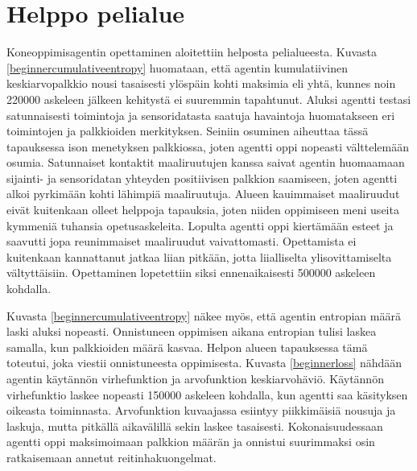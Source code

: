 \documentclass[utf8]{gradu3}
\begin{document}
\section{Helppo pelialue}
\label{helppo}

Koneoppimisagentin opettaminen aloitettiin helposta pelialueesta. Kuvasta \ref{beginnercumulativeentropy} huomataan, että agentin kumulatiivinen keskiarvopalkkio nousi tasaisesti ylöspäin kohti maksimia eli yhtä, kunnes noin 220000 askeleen jälkeen kehitystä ei suuremmin tapahtunut. Aluksi agentti testasi satunnaisesti toimintoja ja sensoridatasta saatuja havaintoja huomatakseen eri toimintojen ja palkkioiden merkityksen. Seiniin osuminen aiheuttaa tässä tapauksessa ison menetyksen palkkiossa, joten agentti oppi nopeasti välttelemään osumia. Satunnaiset kontaktit maaliruutujen kanssa saivat agentin huomaamaan sijainti- ja sensoridatan yhteyden positiivisen palkkion saamiseen, joten agentti alkoi pyrkimään kohti lähimpiä maaliruutuja. Alueen kauimmaiset maaliruudut eivät kuitenkaan olleet helppoja tapauksia, joten niiden oppimiseen meni useita kymmeniä tuhansia opetusaskeleita. Lopulta agentti oppi kiertämään esteet ja saavutti jopa reunimmaiset maaliruudut vaivattomasti. Opettamista ei kuitenkaan kannattanut jatkaa liian pitkään, jotta liialliselta ylisovittamiselta vältyttäisiin. Opettaminen lopetettiin siksi ennenaikaisesti 500000 askeleen kohdalla.

Kuvasta \ref{beginnercumulativeentropy} näkee myös, että agentin entropian määrä laski aluksi nopeasti. Onnistuneen oppimisen aikana entropian tulisi laskea samalla, kun palkkioiden määrä kasvaa. Helpon alueen tapauksessa tämä toteutui, joka viestii onnistuneesta oppimisesta. Kuvasta \ref{beginnerloss} nähdään agentin käytännön virhefunktion ja arvofunktion keskiarvohäviö. Käytännön virhefunktio laskee nopeasti 150000 askeleen kohdalla, kun agentti saa käsityksen oikeasta toiminnasta. Arvofunktion kuvaajassa esiintyy piikkimäisiä nousuja ja laskuja, mutta pitkällä aikavälillä sekin laskee tasaisesti. Kokonaisuudessaan agentti oppi maksimoimaan palkkion määrän ja onnistui suurimmaksi osin ratkaisemaan annetut reitinhakuongelmat.
\end{document}
